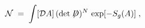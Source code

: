 \begin{equation}\label{eq:defg2}
{\mathcal N}\;=\;  \int [{\mathcal D}A] \, (\det \not \!\! D)^N \,
\exp [ - S_g(A) ] \;,
\end{equation}

